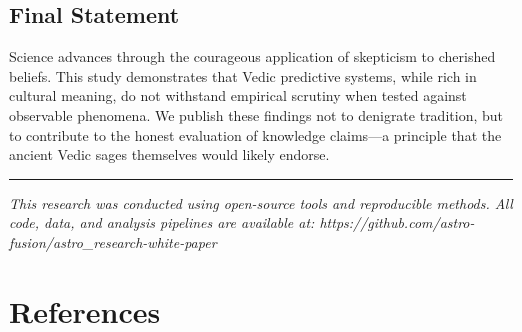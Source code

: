 \documentclass[
  11pt,
  a4paper,
  oneside,
  openany]{article}
\begin{document}
\subsection{Final Statement}\label{final-statement}

Science advances through the courageous application of skepticism to
cherished beliefs. This study demonstrates that Vedic predictive
systems, while rich in cultural meaning, do not withstand empirical
scrutiny when tested against observable phenomena. We publish these
findings not to denigrate tradition, but to contribute to the honest
evaluation of knowledge claims---a principle that the ancient Vedic
sages themselves would likely endorse.

\begin{center}\rule{0.5\linewidth}{0.5pt}\end{center}

\emph{This research was conducted using open-source tools and
reproducible methods. All code, data, and analysis pipelines are
available at:
https://github.com/astro-fusion/astro\_research-white-paper}

\section{References}\label{references}
\end{document}
